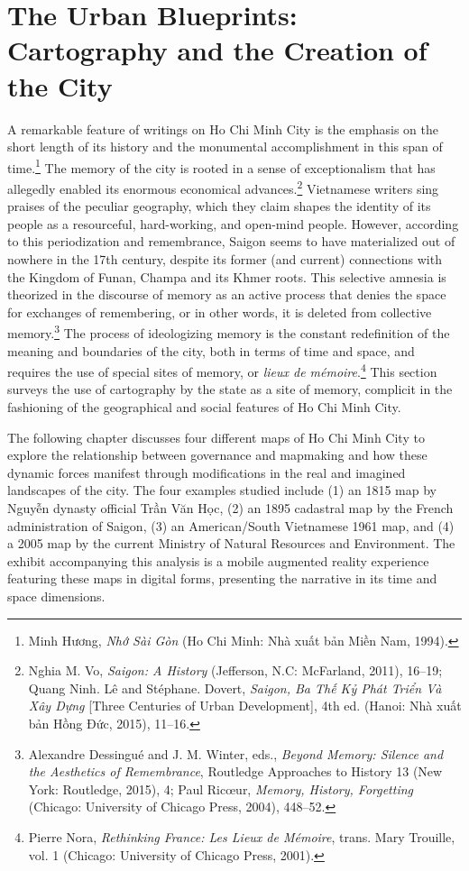 \chapter[The Urban Blueprints]{The Urban Blueprints: Cartography and the Creation of the City}\label{cartography}


A remarkable feature of writings on Ho Chi Minh City is the emphasis on the short length of its history and the monumental accomplishment in this span of time.\footnote{\vi Minh Hương, \textit{Nhớ Sài Gòn} (Ho Chi Minh: Nhà xuất bản Miền Nam, 1994).} The memory of the city is rooted in a sense of exceptionalism that has allegedly enabled its enormous economical advances.\footnote{\vi Nghia M. Vo, \textit{Saigon: A History} (Jefferson, N.C: McFarland, 2011), 16–19; Quang Ninh. Lê and Stéphane. Dovert, \textit{Saigon, Ba Thế Kỷ Phát Triển Và Xây Dựng} [Three Centuries of Urban Development], 4th ed. (Hanoi: Nhà xuất bản Hồng Đức, 2015), 11–16.} Vietnamese writers sing praises of the peculiar geography, which they claim shapes the identity of its people as a resourceful, hard-working, and open-mind people. However, according to this periodization and remembrance, Saigon seems to have materialized out of nowhere in the 17th century, despite its former (and current) connections with the Kingdom of Funan, Champa and its Khmer roots. This selective amnesia is theorized in the discourse of memory as an active process that denies the space for exchanges of remembering, or in other words, it is deleted from collective memory.\footnote{Alexandre Dessingué and J. M. Winter, eds., \textit{Beyond Memory: Silence and the Aesthetics of Remembrance}, Routledge Approaches to History 13 (New York: Routledge, 2015), 4; Paul Ricœur, \textit{Memory, History, Forgetting} (Chicago: University of Chicago Press, 2004), 448–52.} The process of ideologizing memory is the constant redefinition of the meaning and boundaries of the city, both in terms of time and space, and requires the use of special sites of memory, or \textit{lieux de mémoire}.\footnote{Pierre Nora, \textit{Rethinking France: Les Lieux de Mémoire}, trans. Mary Trouille, vol. 1 (Chicago: University of Chicago Press, 2001).} This section surveys the use of cartography by the state as a site of memory, complicit in the fashioning of the geographical and social features of Ho Chi Minh City.

The following chapter discusses four different maps of Ho Chi Minh City to explore the relationship between governance and mapmaking and how these dynamic forces manifest through modifications in the real and imagined landscapes of the city. The four examples studied include (1) an 1815 map by \vi Nguyễn dynasty official Trần Văn Học, (2) an 1895 cadastral map by the French administration of Saigon, (3) an American/South Vietnamese 1961 map, and (4) a 2005 map by the current Ministry of Natural Resources and Environment. The exhibit accompanying this analysis is a mobile augmented reality experience featuring these maps in digital forms, presenting the narrative in its time and space dimensions. \en

